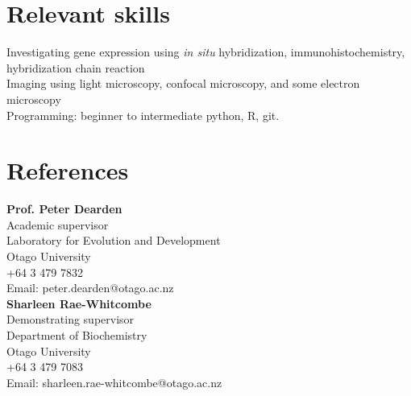 \documentclass[10pt, a4paper]{article}
\begin{document}
\section*{Relevant skills} 
Investigating gene expression using \emph{in situ} hybridization, immunohistochemistry, hybridization chain reaction \\
Imaging using light microscopy, confocal microscopy, and some electron microscopy \\
Programming: beginner to intermediate python, R, git. \\



\section*{References}

\begin{multicols}{2}

\textbf{Prof. Peter Dearden}\\
Academic supervisor\\ 
Laboratory for Evolution and Development\\ 
Otago University\\
+64 3 479 7832\\
Email: peter.dearden@otago.ac.nz\\

\textbf{Sharleen Rae-Whitcombe}\\
Demonstrating supervisor\\ 
Department of Biochemistry\\
Otago University\\ 
+64 3 479 7083\\
Email: sharleen.rae-whitcombe@otago.ac.nz\\


\end{multicols}
\end{document}
